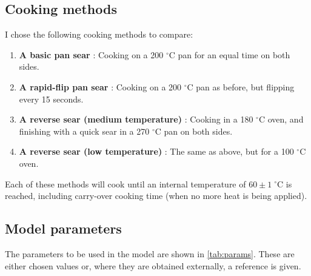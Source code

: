 \documentclass[11pt]{article}
\begin{document}
	\subsection{Cooking methods}
	
	I chose the following cooking methods to compare:
	\begin{enumerate}
		\item \textbf{A basic pan sear} : Cooking on a 200 $^\circ \text{C}$ pan for an equal time on both sides.
		\item \textbf{A rapid-flip pan sear} : Cooking on a 200 $^\circ \text{C}$ pan as before, but flipping every 15 seconds.
		\item \textbf{A reverse sear (medium temperature)} : Cooking in a 180 $^\circ \text{C}$ oven, and finishing with a quick sear in a 270 $^\circ \text{C}$ pan on both sides.
		\item \textbf{A reverse sear (low temperature)} : The same as above, but for a 100 $^\circ \text{C}$ oven.
	\end{enumerate}
	
	Each of these methods will cook until an internal temperature of $60 \pm 1\; ^\circ \mathrm{C}$ is reached, including carry-over cooking time (when no more heat is being applied). 
	
	\subsection{Model parameters}
	
	The parameters to be used in the model are shown in \autoref{tab:params}. These are either chosen values or, where they are obtained externally, a reference is given.
	
\end{document}
